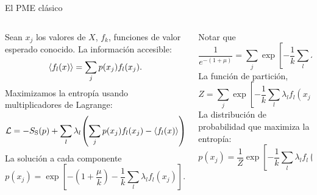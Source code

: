 \begin{frame}{El PME clásico}
    \begin{columns}
        \begin{column}{0.5\textwidth}
            Sean $x_{j}$ los valores de $X$, $f_{k}$, funciones de valor esperado conocido. La información accesible:
            \begin{equation}
            \expval{f_{l}(x)}=\sum_{j}p(x_{j})f_{l}(x_{j}).\nonumber
            \end{equation}
            Maximizamos la entropía usando multiplicadores de Lagrange:
            \begin{equation}
                \mathcal{L}=-S_{\text{S}}(p)+\sum_{l}\lambda_{l}\qty(\sum_{j}p(x_{j})f_{l}(x_{j})-\expval{f_{l}(x)})+\mu\qty(\sum_{j}p(x_{j})-1).\nonumber
            \end{equation}
            La solución a cada componente
            \begin{equation}
                p(x_{j})=\exp[-(1+\frac{\mu}{k})-\frac{1}{k}\sum_{l}\lambda_{l}f_{l}(x_{j})].\nonumber
            \end{equation}
        \end{column}
        \begin{column}{0.5\textwidth}
            Notar que
            \begin{equation}
                \frac{1}{e^{-(1+\mu)}}=\sum_{j}\exp[-\frac{1}{k}\sum_{l}\lambda_{l}f_{l}(x_{j})].\nonumber
            \end{equation}
            La función de partición,
            \begin{equation}
                Z=\sum_{j}\exp[-\frac{1}{k}\sum_{l}\lambda_{l}f_{l}(x_{j})],\nonumber
            \end{equation}
            La distribución de probabilidad que maximiza la entropía: 
            \begin{equation}
                p(x_{j})=\frac{1}{Z}\exp[-\frac{1}{k}\sum_{l}\lambda_{l}f_{l}(x_{j})].\nonumber
            \end{equation}
        \end{column}
    \end{columns}
\end{frame}

